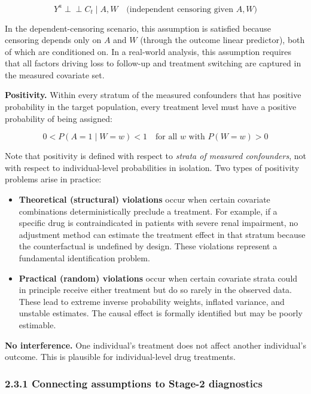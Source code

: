 \documentclass[
  letterpaper,
  DIV=11,
  numbers=noendperiod]{scrartcl}
\begin{document}
\[Y^{a} \perp\!\!\!\perp C_t \mid A, W \quad \text{(independent censoring given } A, W\text{)}\]

In the dependent-censoring scenario, this assumption is satisfied
because censoring depends only on \(A\) and \(W\) (through the outcome
linear predictor), both of which are conditioned on. In a real-world
analysis, this assumption requires that all factors driving loss to
follow-up and treatment switching are captured in the measured covariate
set.

\textbf{Positivity.} Within every stratum of the measured confounders
that has positive probability in the target population, every treatment
level must have a positive probability of being assigned:

\[0 < P(A = 1 \mid W = w) < 1 \quad \text{for all } w \text{ with } P(W = w) > 0\]

Note that positivity is defined with respect to \emph{strata of measured
confounders}, not with respect to individual-level probabilities in
isolation. Two types of positivity problems arise in practice:

\begin{itemize}
\item
  \textbf{Theoretical (structural) violations} occur when certain
  covariate combinations deterministically preclude a treatment. For
  example, if a specific drug is contraindicated in patients with severe
  renal impairment, no adjustment method can estimate the treatment
  effect in that stratum because the counterfactual is undefined by
  design. These violations represent a fundamental identification
  problem.
\item
  \textbf{Practical (random) violations} occur when certain covariate
  strata could in principle receive either treatment but do so rarely in
  the observed data. These lead to extreme inverse probability weights,
  inflated variance, and unstable estimates. The causal effect is
  formally identified but may be poorly estimable.
\end{itemize}

\textbf{No interference.} One individual's treatment does not affect
another individual's outcome. This is plausible for individual-level
drug treatments.

\subsubsection{2.3.1 Connecting assumptions to Stage-2
diagnostics}\label{connecting-assumptions-to-stage-2-diagnostics}
\end{document}
